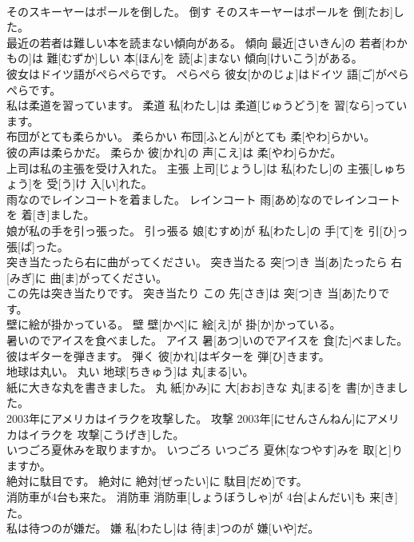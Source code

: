 \documentclass[8pt]{extreport}
\begin{document}
\begin{CJK}{UTF8}{min}
\\	そのスキーヤーはポールを倒した。	倒す	そのスキーヤーはポールを 倒[たお]した。	
\\	最近の若者は難しい本を読まない傾向がある。	傾向	最近[さいきん]の 若者[わかもの]は 難[むずか]しい 本[ほん]を 読[よ]まない 傾向[けいこう]がある。	
\\	彼女はドイツ語がぺらぺらです。	ぺらぺら	彼女[かのじょ]はドイツ 語[ご]がぺらぺらです。	
\\	私は柔道を習っています。	柔道	私[わたし]は 柔道[じゅうどう]を 習[なら]っています。	
\\	布団がとても柔らかい。	柔らかい	布団[ふとん]がとても 柔[やわ]らかい。	
\\	彼の声は柔らかだ。	柔らか	彼[かれ]の 声[こえ]は 柔[やわ]らかだ。	
\\	上司は私の主張を受け入れた。	主張	上司[じょうし]は 私[わたし]の 主張[しゅちょう]を 受[う]け 入[い]れた。	
\\	雨なのでレインコートを着ました。	レインコート	雨[あめ]なのでレインコートを 着[き]ました。	
\\	娘が私の手を引っ張った。	引っ張る	娘[むすめ]が 私[わたし]の 手[て]を 引[ひ]っ 張[ぱ]った。	
\\	突き当たったら右に曲がってください。	突き当たる	突[つ]き 当[あ]たったら 右[みぎ]に 曲[ま]がってください。	
\\	この先は突き当たりです。	突き当たり	この 先[さき]は 突[つ]き 当[あ]たりです。	
\\	壁に絵が掛かっている。	壁	壁[かべ]に 絵[え]が 掛[か]かっている。	
\\	暑いのでアイスを食べました。	アイス	暑[あつ]いのでアイスを 食[た]べました。	
\\	彼はギターを弾きます。	弾く	彼[かれ]はギターを 弾[ひ]きます。	
\\	地球は丸い。	丸い	地球[ちきゅう]は 丸[まる]い。	
\\	紙に大きな丸を書きました。	丸	紙[かみ]に 大[おお]きな 丸[まる]を 書[か]きました。	
\\	2003年にアメリカはイラクを攻撃した。	攻撃	2003年[にせんさんねん]にアメリカはイラクを 攻撃[こうげき]した。	
\\	いつごろ夏休みを取りますか。	いつごろ	いつごろ 夏休[なつやす]みを 取[と]りますか。	
\\	絶対に駄目です。	絶対に	絶対[ぜったい]に 駄目[だめ]です。	
\\	消防車が4台も来た。	消防車	消防車[しょうぼうしゃ]が 4台[よんだい]も 来[き]た。	
\\	私は待つのが嫌だ。	嫌	私[わたし]は 待[ま]つのが 嫌[いや]だ。	

\end{CJK}
\end{document}
